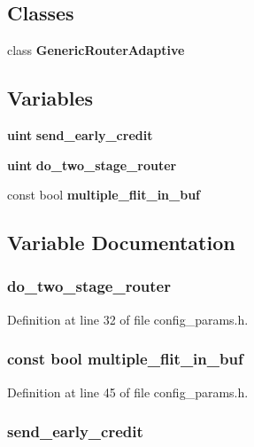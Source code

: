 \subsection*{Classes}
\begin{CompactItemize}
\item 
class {\bf GenericRouterAdaptive}
\end{CompactItemize}
\subsection*{Variables}
\begin{CompactItemize}
\item 
{\bf uint} {\bf send\_\-early\_\-credit}
\item 
{\bf uint} {\bf do\_\-two\_\-stage\_\-router}
\item 
const bool {\bf multiple\_\-flit\_\-in\_\-buf}
\end{CompactItemize}


\subsection{Variable Documentation}
\subsubsection[{do\_\-two\_\-stage\_\-router}]{ {\bf do\_\-two\_\-stage\_\-router}}\label{genericRouterAdaptive_8h_5ef61643d57baddad3f036737403d4cf}




Definition at line 32 of file config\_\-params.h.
\subsubsection[{multiple\_\-flit\_\-in\_\-buf}]{\setlength{\rightskip}{0pt plus 5cm}const bool {\bf multiple\_\-flit\_\-in\_\-buf}}\label{genericRouterAdaptive_8h_6e9030ac7a1abb7387b696f49bcf0fde}




Definition at line 45 of file config\_\-params.h.
\subsubsection[{send\_\-early\_\-credit}]{ {\bf send\_\-early\_\-credit}}\label{genericRouterAdaptive_8h_97bd678cd4246f1a0157eff907e3fea1}


